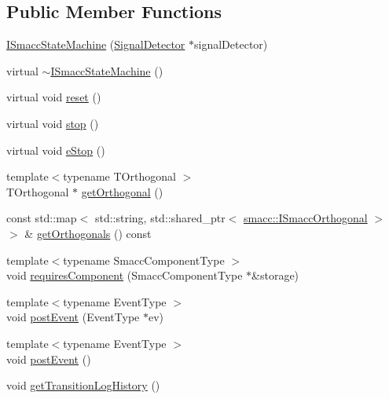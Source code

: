 \subsection*{Public Member Functions}
\begin{DoxyCompactItemize}
\item 
\hyperlink{classsmacc_1_1ISmaccStateMachine_a497c2185584adbec3298d4000277b75e}{I\+Smacc\+State\+Machine} (\hyperlink{classsmacc_1_1SignalDetector}{Signal\+Detector} $\ast$signal\+Detector)
\item 
virtual \hyperlink{classsmacc_1_1ISmaccStateMachine_a54bb9bac0008d3efc6a50cce88dce48e}{$\sim$\+I\+Smacc\+State\+Machine} ()
\item 
virtual void \hyperlink{classsmacc_1_1ISmaccStateMachine_a9e4b4fe4dda962642397993235c6eea0}{reset} ()
\item 
virtual void \hyperlink{classsmacc_1_1ISmaccStateMachine_adcb1b55e014f982a713a863ffb0261d3}{stop} ()
\item 
virtual void \hyperlink{classsmacc_1_1ISmaccStateMachine_a66a2900be8629748dab7a5c5ab6ae94e}{e\+Stop} ()
\item 
{\footnotesize template$<$typename T\+Orthogonal $>$ }\\T\+Orthogonal $\ast$ \hyperlink{classsmacc_1_1ISmaccStateMachine_a38b8b6e3d65b7de33020c9c397cf29bb}{get\+Orthogonal} ()
\item 
const std\+::map$<$ std\+::string, std\+::shared\+\_\+ptr$<$ \hyperlink{classsmacc_1_1ISmaccOrthogonal}{smacc\+::\+I\+Smacc\+Orthogonal} $>$ $>$ \& \hyperlink{classsmacc_1_1ISmaccStateMachine_a5b4dcb0a5135296cf3d728721ecd8053}{get\+Orthogonals} () const 
\item 
{\footnotesize template$<$typename Smacc\+Component\+Type $>$ }\\void \hyperlink{classsmacc_1_1ISmaccStateMachine_aa6b25e28f3bce24c4b356dc865a9eb7b}{requires\+Component} (Smacc\+Component\+Type $\ast$\&storage)
\item 
{\footnotesize template$<$typename Event\+Type $>$ }\\void \hyperlink{classsmacc_1_1ISmaccStateMachine_ad80cdd7bbc9a9f3b221c625754fed1ed}{post\+Event} (Event\+Type $\ast$ev)
\item 
{\footnotesize template$<$typename Event\+Type $>$ }\\void \hyperlink{classsmacc_1_1ISmaccStateMachine_a1549189caf29520514e677ca46f57348}{post\+Event} ()
\item 
void \hyperlink{classsmacc_1_1ISmaccStateMachine_ae7c08fc2addf8ee4785f721050e6a763}{get\+Transition\+Log\+History} ()

\end{DoxyCompactItemize}
